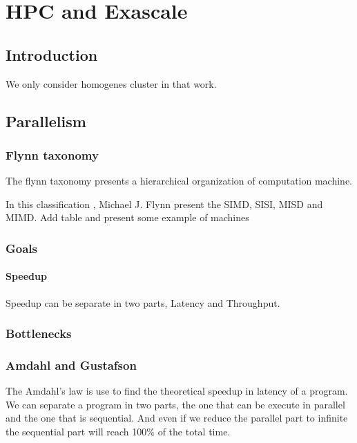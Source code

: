 \chapter{HPC and Exascale}


\section{Introduction}

We only consider homogenes cluster in that work.

\section{Parallelism}

\subsection{Flynn taxonomy}

The flynn taxonomy presents a hierarchical organization of computation machine.

In this classification \cite{flynn1972some}, Michael J. Flynn present the SIMD, SISI, MISD and MIMD.
Add table and present some example of machines

\subsection{Goals}

\subsubsection{Speedup}

Speedup can be separate in two parts, Latency and Throughput.

\subsection{Bottlenecks}

\subsection{Amdahl and Gustafson}

The Amdahl's\cite{amdahl1967validity} law is use to find the theoretical speedup in latency of a program.
We can separate a program in two parts, the one that can be execute in parallel and the one that is sequential. And even if we reduce the parallel part to infinite the sequential part will reach 100\% of the total time. 

